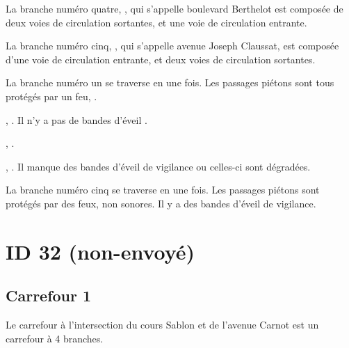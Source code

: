 \begin{appendix}
La branche numéro quatre, , qui s'appelle boulevard Berthelot est composée de deux voies de circulation sortantes, et une voie de circulation entrante.

\newpar{}

La branche numéro cinq, , qui s'appelle avenue Joseph Claussat,  est composée d'une voie de circulation entrante, et deux voies de circulation sortantes.

\newpar{}


La branche numéro un se traverse en une fois. Les passages piétons sont tous protégés par un feu, .  

\newpar{}

, . Il n'y a pas de bandes d'éveil . 

\newpar{}

,  . 

\newpar{}

, . Il manque des bandes d'éveil de vigilance ou celles-ci sont dégradées.

\newpar{}

La branche numéro cinq se traverse en une fois. Les passages piétons sont protégés par des feux, non sonores.  Il y a des bandes d'éveil de vigilance.

\section*{ID 32 (non-envoyé)}

\label{annexe:q_ID32}

\subsection*{Carrefour 1}

\label{annexe:q_ID32_carrefour1}

Le carrefour à l'intersection du cours Sablon et de l'avenue Carnot est un carrefour à 4 branches.


\end{appendix}
